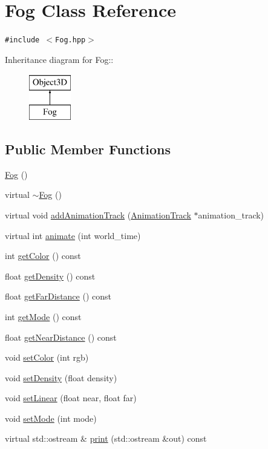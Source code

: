 \hypertarget{classm3g_1_1Fog}{
\section{Fog Class Reference}
\label{classm3g_1_1Fog}
}
{\tt \#include $<$Fog.hpp$>$}

Inheritance diagram for Fog::\begin{figure}[H]
\begin{center}
\leavevmode
\includegraphics[height=2cm]{classm3g_1_1Fog}
\end{center}
\end{figure}
\subsection*{Public Member Functions}
\begin{CompactItemize}
\item 
\hyperlink{classm3g_1_1Fog_232ea9c5f5824d924fa185401fbfb234}{Fog} ()
\item 
virtual \hyperlink{classm3g_1_1Fog_c13d77e65284ed8f7480c8f83ed9780f}{$\sim$Fog} ()
\item 
virtual void \hyperlink{classm3g_1_1Fog_415c0b110f95410ded9b85e5d99a496b}{addAnimationTrack} (\hyperlink{classm3g_1_1AnimationTrack}{AnimationTrack} $\ast$animation\_\-track)
\item 
virtual int \hyperlink{classm3g_1_1Fog_8aad1ceab4c2a03609c8a42324ce484d}{animate} (int world\_\-time)
\item 
int \hyperlink{classm3g_1_1Fog_4cfa1931c265ec3412fe3f6408a1b4f5}{getColor} () const 
\item 
float \hyperlink{classm3g_1_1Fog_31deef556a6aa5e519d3c79bd9c383c0}{getDensity} () const 
\item 
float \hyperlink{classm3g_1_1Fog_90df17252a921929fce6a5e92aed4021}{getFarDistance} () const 
\item 
int \hyperlink{classm3g_1_1Fog_d4ce4524e4751fe5e3cfb8c270347d54}{getMode} () const 
\item 
float \hyperlink{classm3g_1_1Fog_cd7a642e43bf99b0e1c5c24d3c6424a2}{getNearDistance} () const 
\item 
void \hyperlink{classm3g_1_1Fog_b1f5cc0f5cc6bbbd716a526c61f1081d}{setColor} (int rgb)
\item 
void \hyperlink{classm3g_1_1Fog_0ceeda25e326e99d6e971e980a00bd49}{setDensity} (float density)
\item 
void \hyperlink{classm3g_1_1Fog_a46fd556865ae7f1c683c3741b68c168}{setLinear} (float near, float far)
\item 
void \hyperlink{classm3g_1_1Fog_9f407b18ba6235cb96fa95611c1ea3a4}{setMode} (int mode)
\item 
virtual std::ostream \& \hyperlink{classm3g_1_1Fog_6fea17fa1532df3794f8cb39cb4f911f}{print} (std::ostream \&out) const 
\end{CompactItemize}
